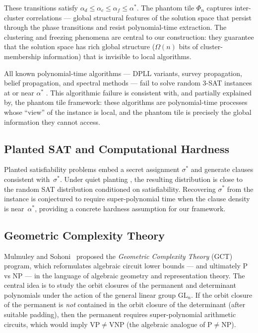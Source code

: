 \documentclass[11pt]{article}
\theoremstyle{definition}
\theoremstyle{remark}
\begin{document}
\noindent
These transitions satisfy $\alpha_d \leq \alpha_c \leq \alpha_f \leq \alpha^*$.
The phantom tile $\Phi_n$ captures inter-cluster correlations --- global
structural features of the solution space that persist through the phase
transitions and resist polynomial-time extraction.  The clustering and
freezing phenomena are central to our construction: they guarantee that
the solution space has rich global structure ($\Omega(n)$ bits of
cluster-membership information) that is invisible to local algorithms.

All known polynomial-time algorithms --- DPLL variants, survey propagation,
belief propagation, and spectral methods --- fail to solve random 3-SAT
instances at or near $\alpha^*$ \cite{MPZ}.  This algorithmic failure is
consistent with, and partially explained by, the phantom tile framework:
these algorithms are polynomial-time processes whose ``view'' of the
instance is local, and the phantom tile is precisely the global information
they cannot access.

\subsection{Planted SAT and Computational Hardness}

Planted satisfiability problems embed a secret assignment $\sigma^*$
and generate clauses consistent with~$\sigma^*$.  Under quiet planting
\cite{planted}, the resulting distribution is close to the random SAT
distribution conditioned on satisfiability.  Recovering $\sigma^*$ from
the instance is conjectured to require super-polynomial time when the
clause density is near~$\alpha^*$, providing a concrete hardness
assumption for our framework.

\subsection{Geometric Complexity Theory}
\label{subsec:gct}

Mulmuley and Sohoni~\cite{GCT} proposed the \emph{Geometric Complexity
Theory} (GCT) program, which reformulates algebraic circuit lower bounds
--- and ultimately P vs NP --- in the language of algebraic geometry and
representation theory.  The central idea is to study the orbit closures
of the permanent and determinant polynomials under the action of the
general linear group $\mathrm{GL}_n$.  If the orbit closure of the
permanent is \emph{not} contained in the orbit closure of the determinant
(after suitable padding), then the permanent requires super-polynomial
arithmetic circuits, which would imply $\mathrm{VP} \neq \mathrm{VNP}$
(the algebraic analogue of $\mathrm{P} \neq \mathrm{NP}$).
\end{document}

